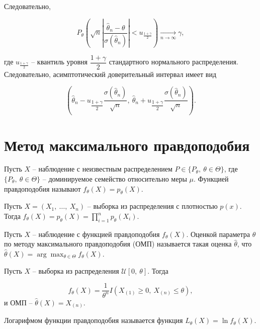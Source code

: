 Следовательно,


\begin{equation*}
    P_{\theta }\left(\sqrt{n}\left| \dfrac{\hat{\theta }_{n} -\theta }{\sigma (\hat{\theta }_{n})}\right| < u_{\frac{1+\gamma }{2}}\right)\xrightarrow[n\rightarrow \infty ]{} \gamma ,
\end{equation*}


где $\displaystyle u_{\frac{1+\gamma }{2}}$ -- квантиль уровня $\displaystyle \dfrac{1+\gamma }{2}$ стандартного нормального распределения. Следовательно, асимптотический доверительный интервал имеет вид


\begin{equation*}
    \left(\hat{\theta }_{n} -u_{\dfrac{1+\gamma }{2}}\dfrac{\sigma (\hat{\theta }_{n})}{\sqrt{n}} ,\ \hat{\theta }_{n} +u_{\dfrac{1+\gamma }{2}}\dfrac{\sigma (\hat{\theta }_{n})}{\sqrt{n}}\right) .
\end{equation*}

\section{Метод максимального правдоподобия}
\begin{definition}
    Пусть $\displaystyle X$ -- наблюдение с неизвестным распределением $\displaystyle P\in \{P_{\theta } ,\ \theta \in \Theta \}$, где $\displaystyle \{P_{\theta } ,\ \theta \in \Theta \}$ -- доминируемое семейство относительно меры $\displaystyle \mu $. Функцией правдоподобия называют $\displaystyle f_{\theta }( X) =p_{\theta }( X)$.
\end{definition}
\begin{example}
    Пусть $\displaystyle X=( X_{1} ,\ \dotsc ,\ X_{n})$ -- выборка из распределения с плотностью $\displaystyle p( x)$. Тогда $\displaystyle f_{\theta }( X) =p_{\theta }( X) =\prod _{i=1}^{n} p_{\theta }( X_{i})$.
\end{example}
\begin{definition}
    Пусть $\displaystyle X$ -- наблюдение с функцией правдоподобия $\displaystyle f_{\theta }( X)$. Оценкой параметра $\displaystyle \theta $ по методу максимального правдоподобия (ОМП) называется такая оценка $\displaystyle \hat{\theta }$, что $\displaystyle \hat{\theta }( X) =\arg\max_{\theta \in \Theta } f_{\theta }( X)$.
\end{definition}
\begin{example}
    Пусть $\displaystyle X$ -- выборка из распределения $\displaystyle \mathcal{U}[ 0,\ \theta ]$. Тогда
    
    
    \begin{equation*}
        f_{\theta }( X) =\dfrac{1}{\theta ^{n}} I( X_{( 1)} \geqslant 0,\ X_{( n)} \leqslant \theta ) ,
    \end{equation*}
    и ОМП -- $\displaystyle \hat{\theta }( X) =X_{( n)}$.
\end{example}
\begin{definition}
    Логарифмом функции правдоподобия называется функция $\displaystyle L_{\theta }( X) =\ln f_{\theta }( X)$.
\end{definition}
